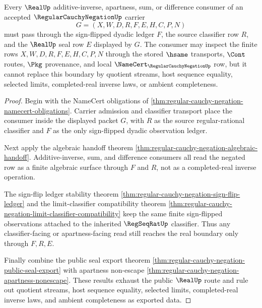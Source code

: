 \begin{theorem}
\label{thm:regular-cauchy-negation-additive-inverse-boundary}
Every $\RealUp$ additive-inverse, apartness, sum, or difference consumer of an accepted $\RegularCauchyNegationUp$ carrier
$$
G=(X,W,D,R,F,E,H,C,P,N)
$$
must pass through the sign-flipped dyadic ledger $F$, the source classifier row $R$, and the $\RealUp$ seal row $E$ displayed by $G$. The consumer may inspect the finite rows $X,W,D,R,F,E,H,C,P,N$ through the stored $\hsame$ transports, $\Cont$ routes, $\Pkg$ provenance, and local $\NameCert_{\RegularCauchyNegationUp}$ row, but it cannot replace this boundary by quotient streams, host sequence equality, selected limits, completed-real inverse laws, or ambient completeness.
\end{theorem}
\begin{proof}
Begin with the NameCert obligations of \autoref{thm:regular-cauchy-negation-namecert-obligations}. Carrier admission and classifier transport place the consumer inside the displayed packet $G$, with $R$ as the source regular-rational classifier and $F$ as the only sign-flipped dyadic observation ledger.

Next apply the algebraic handoff theorem \autoref{thm:regular-cauchy-negation-algebraic-handoff}. Additive-inverse, sum, and difference consumers all read the negated row as a finite algebraic surface through $F$ and $R$, not as a completed-real inverse operation.

The sign-flip ledger stability theorem \autoref{thm:regular-cauchy-negation-sign-flip-ledger} and the limit-classifier compatibility theorem \autoref{thm:regular-cauchy-negation-limit-classifier-compatibility} keep the same finite sign-flipped observations attached to the inherited $\RegSeqRatUp$ classifier. Thus any classifier-facing or apartness-facing read still reaches the real boundary only through $F,R,E$.

Finally combine the public seal export theorem \autoref{thm:regular-cauchy-negation-public-seal-export} with apartness non-escape \autoref{thm:regular-cauchy-negation-apartness-nonescape}. These results exhaust the public $\RealUp$ route and rule out quotient streams, host sequence equality, selected limits, completed-real inverse laws, and ambient completeness as exported data.
\end{proof}

